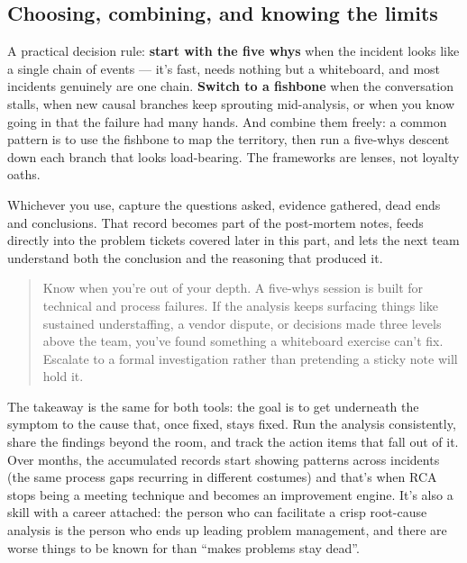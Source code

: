 \subsection{Choosing, combining, and knowing the limits}


A practical decision rule: \textbf{start with the five whys} when the incident looks like a single chain of events — it's fast, needs nothing but a whiteboard, and most incidents genuinely are one chain. \textbf{Switch to a fishbone} when the conversation stalls, when new causal branches keep sprouting mid-analysis, or when you know going in that the failure had many hands. And combine them freely: a common pattern is to use the fishbone to map the territory, then run a five-whys descent down each branch that looks load-bearing. The frameworks are lenses, not loyalty oaths.


Whichever you use, capture the questions asked, evidence gathered, dead ends and conclusions. That record becomes part of the post-mortem notes, feeds directly into the problem tickets covered later in this part, and lets the next team understand both the conclusion and the reasoning that produced it.



\begin{quote}\small
Know when you're out of your depth. A five-whys session is built for technical and process failures. If the analysis keeps surfacing things like sustained understaffing, a vendor dispute, or decisions made three levels above the team, you've found something a whiteboard exercise can't fix. Escalate to a formal investigation rather than pretending a sticky note will hold it.
\end{quote}


The takeaway is the same for both tools: the goal is to get underneath the symptom to the cause that, once fixed, stays fixed. Run the analysis consistently, share the findings beyond the room, and track the action items that fall out of it. Over months, the accumulated records start showing patterns across incidents (the same process gaps recurring in different costumes) and that's when RCA stops being a meeting technique and becomes an improvement engine. It's also a skill with a career attached: the person who can facilitate a crisp root-cause analysis is the person who ends up leading problem management, and there are worse things to be known for than ``makes problems stay dead''.

